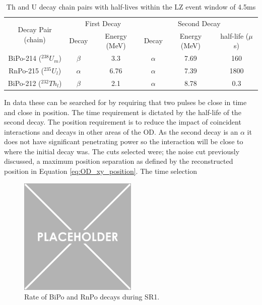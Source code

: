 \begin{table}[!htbp]
    \centering
    \begin{tabular}{c|c|c|c|c|c}
        \multirow{2}{*}{Decay Pair (chain)} & \multicolumn{2}{c}{First Decay}    & \multicolumn{3}{c}{Second Decay}    \\ 
                                            & Decay    & Energy (MeV) & Decay    & Energy (MeV) & half-life ($\mu$s) \\ \hline
        BiPo-214 (${}^{238}U_{m}$)          & $\beta$  & 3.3          & $\alpha$ & 7.69         & 160   \\ 
        RnPo-215 (${}^{235}U_{l}$)          & $\alpha$ & 6.76         & $\alpha$ & 7.39         & 1800  \\ 
        BiPo-212 (${}^{232}Th_{l}$)         & $\beta$  & 2.1          & $\alpha$ & 8.78         & 0.3
    \end{tabular}
    \caption{Th and U decay chain pairs with half-lives within the LZ event window of 4.5ms}
    \label{tab:od_constrainable_decays_in_data}
\end{table}

\par
In data these can be searched for by requiring that two pulses be close in time and close in position. 
The time requirement is dictated by the half-life of the second decay.
The position requirement is to reduce the impact of coincident interactions and decays in other areas of the OD.
As the second decay is an $\alpha$ it does not have significant penetrating power so the interaction will be close to where the initial decay was.
The cuts selected were; the noise cut previously discussed, a maximum position separation as defined by the reconstructed position in Equation \ref{eq:OD_xy_position}.
The time selection


\begin{figure}
    \centering
    \includegraphics[width=0.5\textwidth]{Figures/Placeholder.png}
    \caption{Rate of BiPo and RnPo decays during SR1.}
    \label{fig:OD_BiPo_Rate}
\end{figure}

